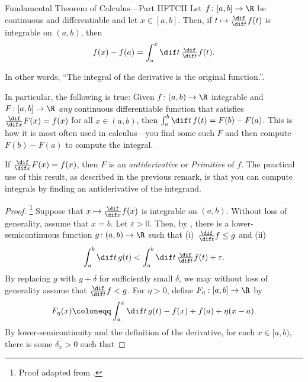 \begin{thm}{Fundamental Theorem of Calculus---Part II}{FTCII}
Let $f\colon [a,b]\rightarrow \R$ be continuous and differentiable and let $x\in [a,b]$.  Then, if $t\mapsto \frac{\dif}{\dif t}f(t)$ is integrable on $(a,b)$, then
\begin{equation}
f(x)-f(a)=\int _a^x\dif t\, \tfrac{\dif}{\dif t}f(t).
\end{equation}
\begin{rmk}
In other words, ``The integral of the derivative is the original function.''.
\end{rmk}
\begin{rmk}
In particular, the following is true:  Given $f\colon (a,b)\rightarrow \R$ integrable and $F\colon [a,b]\rightarrow \R$ \emph{any} continuous differentiable function that satisfies $\frac{\dif}{\dif x}F(x)=f(x)$ for all $x\in (a,b)$, then $\int _a^b\dif t\, f(t)=F(b)-F(a)$.  This is how it is most often used in calculus---you find some such $F$ and then compute $F(b)-F(a)$ to compute the integral.
\end{rmk}
\begin{rmk}
If $\frac{\dif}{\dif x}F(x)=f(x)$, then $F$ is an \emph{antiderivative} or \emph{Primitive} of $f$.  The practical use of this result, as described in the previous remark, is that you can compute integrals by finding an antiderivative of the integrand.
\end{rmk}
\begin{proof}\footnote{Proof adapted from \cite[pg.~149]{BigRudin}.}
Suppose that $x\mapsto \frac{\dif}{\dif x}f(x)$ is integrable on $(a,b)$.  Without loss of generality, assume that $x=b$.  Let $\varepsilon >0$.  Then, by , there is a lower-semicontinuous function $g\colon (a,b)\rightarrow \R$ such that (i)~$\frac{\dif}{\dif t}f\leq g$ and (ii)
\begin{equation}
\int _a^b\dif t\, g(t)<\int _a^b\dif t\, \tfrac{\dif}{\dif t}f(t)+\varepsilon .
\end{equation}
By replacing $g$ with $g+\delta$ for sufficiently small $\delta$, we may without loss of generality assume that $\frac{\dif}{\dif t}f<g$.  For $\eta >0$, define $F_\eta :[a,b]\rightarrow \R$ by
\begin{equation}\label{Rudin3}
F_\eta (x)\coloneqq \int _a^x\dif t\, g(t)-f(x)+f(a)+\eta (x-a).
\end{equation}
By lower-semicontinuity and the definition of the derivative, for each $x\in [a,b)$, there is some $\delta _x>0$ such that

\end{proof}
\end{thm}
